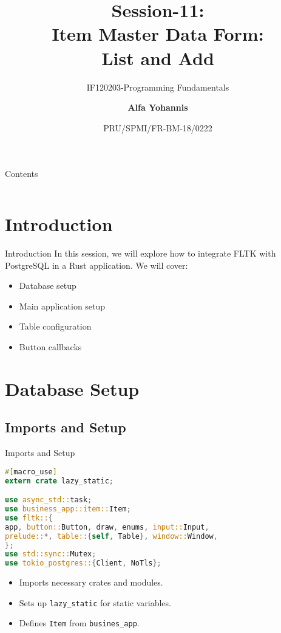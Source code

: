 \documentclass[aspectratio=169, table]{beamer}
\subtitle{IF120203-Programming Fundamentals}
\title{Session-11:\\\LARGE{Item Master Data Form:\\List and Add}}
\date[Serial]{\scriptsize {PRU/SPMI/FR-BM-18/0222}}
\author[Pradita]{\small{\textbf{Alfa Yohannis}}}
\begin{document}
\frame{\titlepage}

\begin{frame}{Contents}
\vspace{15pt}
\begin{columns}[t]
\begin{column}{.5\textwidth}
\tableofcontents[sections={1-3}]
\end{column}
\begin{column}{.5\textwidth}
\tableofcontents[sections={4-6}]
\end{column}
\end{columns}
\end{frame}


\section{Introduction}
\begin{frame}{Introduction}
In this session, we will explore how to integrate FLTK with PostgreSQL in a Rust application. We will cover:
\begin{itemize}
\item Database setup
\item Main application setup
\item Table configuration
\item Button callbacks
\end{itemize}
\end{frame}

\section{Database Setup}
\subsection{Imports and Setup}
\begin{frame}[fragile]{Imports and Setup}
\vspace{15pt}
\begin{lstlisting}[language=Rust]
#[macro_use]
extern crate lazy_static;

use async_std::task;
use business_app::item::Item;
use fltk::{
app, button::Button, draw, enums, input::Input,
prelude::*, table::{self, Table}, window::Window,
};
use std::sync::Mutex;
use tokio_postgres::{Client, NoTls};
\end{lstlisting}

\begin{itemize}
\item Imports necessary crates and modules.
\item Sets up \texttt{lazy\_static} for static variables.
\item Defines \texttt{Item} from \texttt{busines\_app}.
\end{itemize}
\end{frame}
\end{document}
